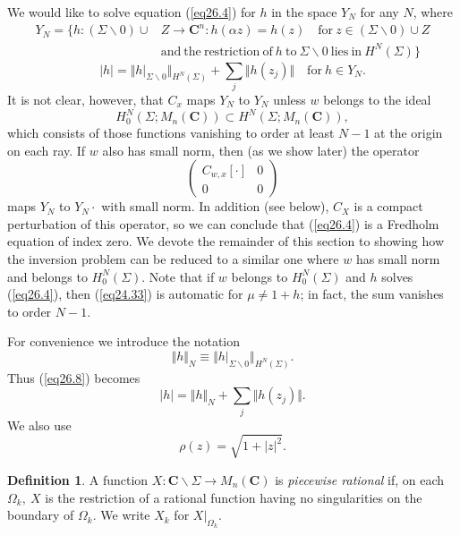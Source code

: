 \documentclass{surv-l}
\theoremstyle{plain}
\theoremstyle{definition}
\newtheorem{definition}[theorem]{Definition}
\numberwithin{equation}{chapter}
\begin{document}
We would like to solve equation (\ref{eq26.4}) for $h$ in the space $Y_{N}$ for any $N$, where
\begin{align}\label{eq26.7}
Y_{N}=\{h:(\Sigma\backslash 0)\cup &Z\rightarrow \mathbf{C}^{n}:h(\alpha z)=h(z)\quad \mathrm{for}\ z\in(\Sigma\backslash 0)\cup Z\\
&\mathrm{and\ the\ restriction\ of}\ h\ \mathrm{to}\ \Sigma\backslash 0\ \mathrm{lies\ in}\ H^{N}(\Sigma)\}\nonumber
\end{align}
\begin{equation}\label{eq26.8}
|h|=\Vert h|_{\Sigma\backslash 0}\Vert_{{H^{N}}(\Sigma)}+ \sum_{j}\Vert h(z_{j})\Vert\quad \mathrm{for}\ h\in Y_{N}.
\end{equation}
It is not clear, however, that $C_{x}$ maps $Y_{N}$ to $Y_{N}$ unless $w$ belongs to the ideal
\begin{equation}\label{eq26.9}
H_{0}^{N}(\Sigma; M_{n}(\mathbf{C}))\subset H^{N}(\Sigma;M_{n}(\mathbf{C})),
\end{equation}
which consists of those functions vanishing to order at least $N-1$ at the origin on each ray. If $w$ also has small norm, then (as we show later) the operator
\begin{equation*}
\left(\begin{array}{cc}
C_{w,x}[\cdot] & 0\\
0 & 0
\end{array}\right)
\end{equation*}
maps $Y_{N}$ to $Y_{N}\cdot$ with small norm. In addition (see below), $C_{X}$ is a compact perturbation of this operator, so we can conclude that (\ref{eq26.4}) is a Fredholm equation of index zero. We devote the remainder of this section to showing how the inversion problem can be reduced to a similar one where $w$ has small norm and belongs to $H_{0}^{N}(\Sigma)$. Note that if $w$ belongs to $H_{0}^{N}(\Sigma)$ and $h$ solves (\ref{eq26.4}), then (\ref{eq24.33}) is automatic for $\mu\neq 1+h$; in fact, the sum vanishes to order $N-1$.

For convenience we introduce the notation
\begin{equation}\label{eq26.10}
\Vert h\Vert_{N}\equiv\Vert h|_{\Sigma\backslash 0}\Vert_{{H^{N}}(\Sigma)}.
\end{equation}
Thus (\ref{eq26.8}) becomes
\begin{equation*}
|h|=\Vert h\Vert_{N}+\sum_{j}\Vert h(z_{j})\Vert.
\end{equation*}
We also use
\begin{equation}\label{eq26.11}
\rho(z)=\sqrt{1+|z|^{2}}.
\end{equation}
\setcounter{theorem}{11}
\begin{definition}\label{defi26.12}
A function $X:\mathbf{C}\backslash \Sigma\rightarrow M_{n}(\mathbf{C})$ is \emph{piecewise rational} if, on each $\Omega_{k},\ X$ is the restriction of a rational function having no singularities on the boundary of $\Omega_{k}$. We write $X_{k}$ for $X|_{\Omega_{k}}$.
\end{definition}
\end{document}
